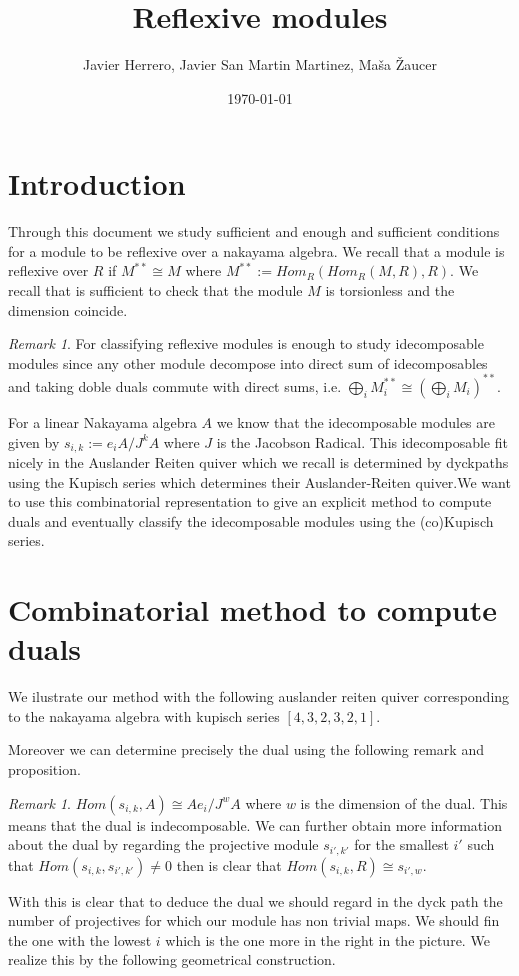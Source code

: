 \documentclass[12pt, a4paper]{article}
\title{Reflexive modules}
\author{Javier Herrero, Javier San Martin Martinez, Maša Žaucer}
\date{\today}
\numberwithin{equation}{section}
\theoremstyle{definition}
\theoremstyle{plain}
\theoremstyle{remark}
\newtheorem{remark}[definition]{Remark}
\begin{document}
\maketitle


\begin{abstract}
\end{abstract}

\section{Introduction}
Through this document we study sufficient and enough and sufficient conditions for a module to be reflexive over a nakayama algebra. We recall that a module is reflexive over $R$ if $M^{**}\cong M$ where $M^{**}:=Hom_R(Hom_R(M,R),R).$ We recall that is sufficient to check that the module $M$ is torsionless and the dimension coincide.
\begin{remark}
    For classifying reflexive modules is enough to study idecomposable modules since any other module decompose into direct sum of idecomposables and taking doble duals commute with direct sums, i.e. $\bigoplus_i M_i^{**}\cong (\bigoplus_iM_i)^{**}.$
\end{remark}
For a linear Nakayama algebra $A$ we know that the idecomposable modules are given by $s_{i,k}:=e_iA/J^kA$ where $J$ is the Jacobson Radical. This idecomposable fit nicely in the Auslander Reiten quiver which we recall is determined by dyckpaths using the Kupisch series which determines their Auslander-Reiten quiver.We want to use this combinatorial representation to give an explicit method to compute duals and eventually classify the idecomposable modules using the (co)Kupisch series. 
\section{Combinatorial method to compute duals}
We ilustrate our method with the following auslander reiten quiver corresponding to the nakayama algebra with kupisch series $[4,3,2,3,2,1].$


 Moreover we can determine precisely the dual using the following remark and proposition.
 \begin{remark}
     $Hom(s_{i,k},A)\cong Ae_i/J^wA$ where $w$ is the dimension of the dual. This means that the dual is indecomposable. We can further obtain more information about the dual by regarding the projective module $s_{i',k'}$ for the smallest $i'$ such that $Hom(s_{i,k},s_{i',k'})\neq 0$ then is clear that $Hom(s_{i,k},R)\cong s_{i',w}.$ 
 \end{remark}
With this is clear that to deduce the dual we should regard in the dyck path the number of projectives for which our module has non trivial maps. We should fin the one with the lowest $i$ which is the one more in the right in the picture. We realize this by the following geometrical construction. 
\end{document}
